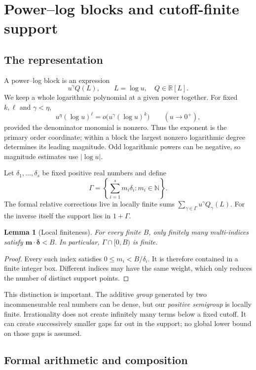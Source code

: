 \documentclass[11pt,a4paper]{article}
\numberwithin{equation}{section}
\newtheorem{lemma}[theorem]{Lemma}
\theoremstyle{definition}
\theoremstyle{remark}
\newcommand{\N}{\mathbb N}
\newcommand{\R}{\mathbb R}
\begin{document}
\section{Power--log blocks and cutoff-finite support}
\label{sec:support}

\subsection{The representation}

A power--log block is an expression
\[
 u^\gamma Q(L),\qquad L=\log u,\quad Q\in\R[L].
\]
We keep a whole logarithmic polynomial at a given power together. For
fixed $k,\ell$ and $\gamma<\eta$,
\[
 u^\eta(\log u)^\ell=o\bigl(u^\gamma(\log u)^k\bigr)
 \qquad(u\to0^+),
\]
provided the denominator monomial is nonzero. Thus the exponent is the
primary order coordinate; within a block the largest nonzero logarithmic
degree determines its leading magnitude. Odd logarithmic powers can be
negative, so magnitude estimates use $|\log u|$.

Let $\delta_1,\ldots,\delta_s$ be fixed positive real numbers and define
\begin{equation}\label{eq:semigroup}
 \Gamma=\left\{\sum_{i=1}^s m_i\delta_i:m_i\in\N\right\}.
\end{equation}
The formal relative corrections live in locally finite sums
$\sum_{\gamma\in\Gamma}u^\gamma Q_\gamma(L)$.
For the inverse itself the support lies in $1+\Gamma$.

\begin{lemma}[Local finiteness]\label{lem:finite}
For every finite $B$, only finitely many multi-indices satisfy
$\boldsymbol m\cdot\boldsymbol\delta<B$. In particular, $\Gamma\cap[0,B)$
is finite.
\end{lemma}
\begin{proof}
Every such index satisfies $0\le m_i<B/\delta_i$. It is therefore contained
in a finite integer box. Different indices may have the same weight,
which only reduces the number of distinct support points.
\end{proof}

This distinction is important. The additive \emph{group} generated by two
incommensurable real numbers can be dense, but our \emph{positive semigroup}
is locally finite. Irrationality does not create infinitely many terms
below a fixed cutoff. It can create successively smaller gaps far out in
the support; no global lower bound on those gaps is assumed.

\subsection{Formal arithmetic and composition}
\end{document}
